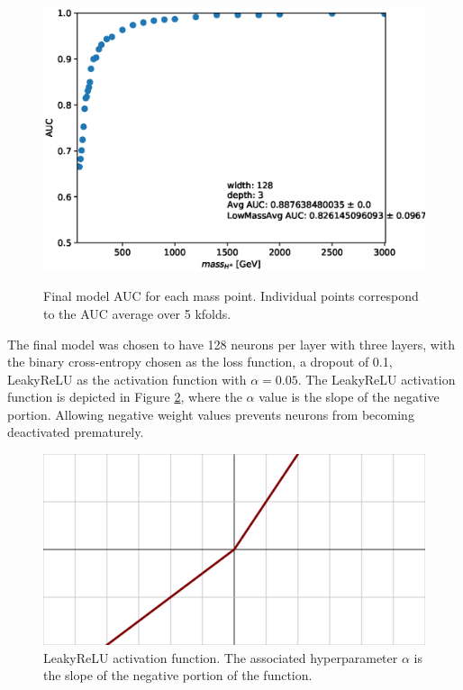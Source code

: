			\clearpage
			\begin{figure}
			  \centering
			  \includegraphics[width=\textwidth,keepaspectratio=true]{chapters/chapter6_Hplus/images/AUC_Plots/model_GB_1024_channel_taulep_mass_80to3000_ntracks_1_nfolds_5_fold_4_nvars_19_batch_size_1024_epochs_1000_dense_layer_size_128_activation_function_LeakyRelu_depth_3_loss_binary_crossentropy_dropout_0.1_alpha_0.05.eps}\\
			  \caption{Final model \gls{AUC} for each mass point. Individual points correspond to the \gls{AUC} average over 5 kfolds. }
			  \label{fig:final-auc}
			\end{figure}

			The final model was chosen to have 128 neurons per layer with three layers, with the binary cross-entropy chosen as the loss function, a dropout of 0.1, LeakyReLU as the activation function with $\alpha=0.05$. The LeakyReLU activation function is depicted in Figure \ref{fig:leaky-relu}, where the $\alpha$ value is the slope of the negative portion. Allowing negative weight values prevents neurons from becoming deactivated prematurely.

			\begin{figure}
				\centering
				\includegraphics[width=.4\textwidth,keepaspectratio=true]{chapters/chapter6_HPlus/images/Activation_prelu.svg.png}
				\caption{LeakyReLU activation function. The associated hyperparameter $\alpha$ is the slope of the negative portion of the function.}
				\label{fig:leaky-relu}
			\end{figure}

